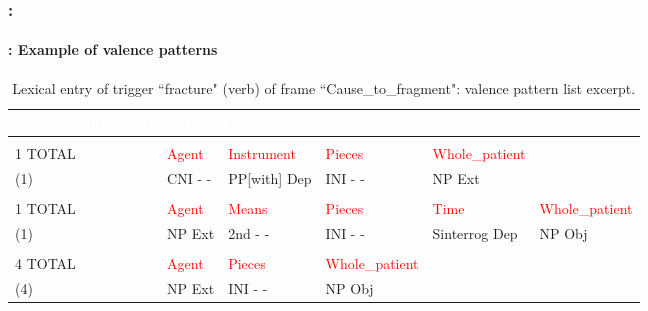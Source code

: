 \documentclass[xcolor=table]{beamer}
\begin{document}
\begin{frame}
	\frametitle{\insertshortsubtitle: \insertsection}
	\framesubtitle{\insertsubsection: Example of valence patterns}
	
	\vspace{-6pt}
	\begin{table}
		\tiny\bfseries
		\begin{tabular}{|p{}|p{}|p{}|p{}|p{}|p{}|}
			\hline
			\rowcolor{darkblue}
			\textcolor{white}{Number Annotated} & \multicolumn{5}{|l|}{\textcolor{white}{Patterns}}\\
			\hline
			\multicolumn{6}{l}{ }\\
			
			\hline
			\rowcolor{lightyellow}
			1 TOTAL & \textcolor{red}{Agent} & \textcolor{red}{Instrument} & \textcolor{red}{Pieces} & \textcolor{red}{Whole\_patient} & \\
			\hline
			\rowcolor{lightyellow}
			(1) & CNI \newline - - & PP[with] \newline Dep & INI \newline - - & NP \newline Ext & \\
			\hline
			\multicolumn{6}{l}{ }\\
			
			\hline
			\rowcolor{lightblue}
			1 TOTAL & \textcolor{red}{Agent} & \textcolor{red}{Means} & \textcolor{red}{Pieces} & \textcolor{red}{Time} & \textcolor{red}{Whole\_patient} \\
			\hline
			\rowcolor{lightblue}
			(1) & NP \newline Ext & 2nd \newline - - & INI \newline - - & Sinterrog \newline Dep & NP \newline Obj \\
			\hline
			\multicolumn{6}{l}{ }\\
			
			\hline
			\rowcolor{lightyellow}
			4 TOTAL & \textcolor{red}{Agent} & \textcolor{red}{Pieces} & \textcolor{red}{Whole\_patient} & & \\
			\hline
			\rowcolor{lightyellow}
			(4) & NP \newline Ext & INI \newline - - & NP \newline Obj & & \\
			\hline
		\end{tabular}
		\caption{Lexical entry of trigger ``fracture" (verb) of frame ``Cause\_to\_fragment": valence pattern list excerpt.}
	\end{table}
	
\end{frame}
\end{document}
